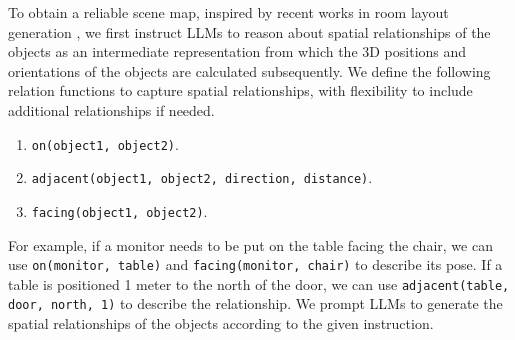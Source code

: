 To obtain a reliable scene map, inspired by recent works in room layout generation \cite{aguina2024open, yang2024holodeck}, we first instruct LLMs to reason about spatial relationships of the objects as an intermediate representation from which the 3D positions and orientations of the objects are calculated subsequently.
We define the following relation functions to capture spatial relationships, with flexibility to include additional relationships if needed.

\begin{enumerate}
    \item \texttt{on(object1, object2)}.
    \item \texttt{adjacent(object1, object2, direction, distance)}.
    \item \texttt{facing(object1, object2)}.
\end{enumerate}

For example, if a monitor needs to be put on the table facing the chair, we can use \texttt{on(monitor, table)} and \texttt{facing(monitor, chair)} to describe its pose. If a table is positioned 1 meter to the north of the door, we can use \texttt{adjacent(table, door, north, 1)} to describe the relationship. 
We prompt LLMs to generate the spatial relationships of the objects according to the given instruction. 


